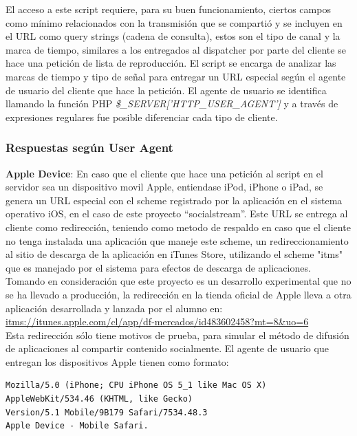 El acceso a este script requiere, para su buen funcionamiento, ciertos campos como mínimo relacionados con la transmisión que se compartió y se incluyen en el URL como query strings (cadena de consulta), estos son el tipo de canal y la marca de tiempo, similares a los entregados al dispatcher por parte del cliente se hace una petición de lista de reproducción.
El script se encarga de analizar las marcas de tiempo y tipo de señal para entregar un URL especial según el agente de usuario del cliente que hace la petición.
El agente de usuario se identifica llamando la función PHP \textit{\$\_SERVER['HTTP\_USER\_AGENT']} y a través de expresiones regulares fue posible diferenciar cada tipo de cliente.

		\subsubsection{Respuestas según User Agent}
\textbf{Apple Device}: En caso que el cliente que hace una petición al script en el servidor sea un dispositivo movil Apple, entiendase iPod, iPhone o iPad, se genera un URL especial con el scheme registrado por la aplicación en el sistema operativo iOS, en el caso de este proyecto \textquotedblleft socialstream\textquotedblright . Este URL se entrega al cliente como redirección, teniendo como metodo de respaldo en caso que el cliente no tenga instalada una aplicación que maneje este scheme, un redireccionamiento al sitio de descarga de la aplicación en iTunes Store, utilizando el scheme "itms" que es manejado por el sistema para efectos de descarga de aplicaciones. \\ 

Tomando en consideración que este proyecto es un desarrollo experimental que no se ha llevado a producción, la redirección en la tienda oficial de Apple lleva a otra aplicación desarrollada y lanzada por el alumno en: \url{itms://itunes.apple.com/cl/app/df-mercados/id483602458?mt=8\&uo=6} \\
Esta redirección sólo tiene motivos de prueba, para simular el método de difusión de aplicaciones al compartir contenido socialmente.
El agente de usuario que entregan los dispositivos Apple tienen como formato: 
	\begin {lstlisting}
Mozilla/5.0 (iPhone; CPU iPhone OS 5_1 like Mac OS X) 
AppleWebKit/534.46 (KHTML, like Gecko) 
Version/5.1 Mobile/9B179 Safari/7534.48.3
Apple Device - Mobile Safari.
\end{lstlisting} 
~\\ %

